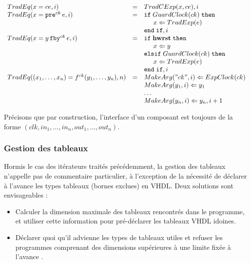 \documentclass[a4paper]{article}
\newcommand{\mybox}[1]{\mbox{\tt{#1}}}
\newcommand{\ind}[0]{\hspace{0.5cm}}
\newcommand{\Fby}[2]{#1 \, \mybox{fby}^{ck} \, #2}
\newcommand{\Pre}[1]{\mybox{pre}^{ck} \, #1}
\newcommand{\App}[2]{#1^{ck}(#2)}
\newcommand{\Assign}[2]{#1 \Leftarrow #2}
\begin{document}
\[
\begin{array}{lcl}
  \TradEq{x = ce}{i} & = & \TradCE{x}{ce}, i \\

  \TradEq{x = \Pre{e}}{i} & = & \mathtt{if} \; \GEC{ck} \; \mathtt{then} \\
  & & \ind \Assign{x}{\TradE{e}} \\
  & & \mathtt{end} \; \mathtt{if}, i \\

  \TradEq{x = \Fby{y}{e}}{i} & = & \mathtt{if} \; \mathbf{hwrst}
  \; \mathtt{then} \\
  & & \ind \Assign{x}{y} \\
  & & \mathtt{elsif} \; \GEC{ck} \; \mathtt{then} \\
  & & \ind \Assign{x}{\TradE{e}} \\
  & & \mathtt{end} \; \mathtt{if}, i \\


  \TradEq{(x_1,\dots,x_n) = \App{f}{y_1,\dots,y_n}}{n} & = &
  \Assign{\MA{"ck"}{i}}{\EC{ck}} \\
  & & \Assign{\MA{y_1}{i}}{y_1} \\
  & & \dots \\
  & & \Assign{\MA{y_n}{i}}{y_n}, i + 1 \\
\end{array}
\]

Pr\'ecisons que par construction, l'interface d'un composant est toujours de la
forme $(clk, in_1, \dots,in_n, out_1,\dots,out_n)$.

\subsubsection{Gestion des tableaux}

Hormis le cas des it\'erateurs trait\'es pr\'ec\'edemment, la gestion des
tableaux n'appelle pas de commentaire particulier, \`a l'exception de la
n\'ecessit\'e de d\'eclarer \`a l'avance les types tableaux (bornes exclues) en
VHDL. Deux solutions sont envisageables :

\begin{itemize}
\item Calculer la dimension maximale des tableaux rencontr\'es dans le programme,
  et utiliser cette information pour pr\'e-d\'eclarer les tableaux VHDL idoines.
\item D\'eclarer quoi qu'il advienne les types de tableaux utiles et refuser les
  programmes comprenant des dimensions sup\'erieures \`a une limite fix\'ee \`a l'avance
  .
\end{itemize}
\end{document}

